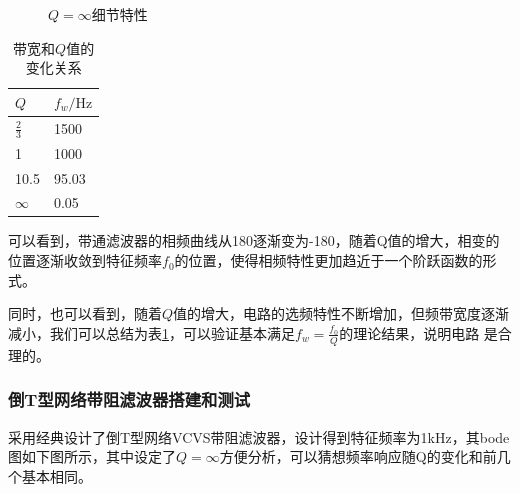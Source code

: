 \documentclass[UTF8,a4paper]{paper}
\begin{document}
\begin{multicols}{2}
\begin{figure}[H]
\caption{$Q=\infty$细节特性}
\label{PQinf1}
\end{figure}
\begin{table}[H]
\centering
\label{table1}
\caption{带宽和$Q$值的变化关系}
\begin{tabular}{ll}
\hline
$Q$&$f_w/\mathrm{Hz}$\\
\hline
$\frac{2}{3}$&1500\\
1&1000\\
10.5&95.03\\
$\infty$&0.05\\
\hline
\end{tabular}
\end{table}
\end{multicols}
可以看到，带通滤波器的相频曲线从180逐渐变为-180，随着Q值的增大，相变的位置逐渐收敛到特征频率$f_0$的位置，使得相频特性更加趋近于一个阶跃函数的形式。

同时，也可以看到，随着$Q$值的增大，电路的选频特性不断增加，但频带宽度逐渐减小，我们可以总结为表\ref{table1}，可以验证基本满足$f_w=\frac{f_0}{Q}$的理论结果，说明电路 是合理的。

\subsubsection{倒T型网络带阻滤波器搭建和测试}
采用经典设计了倒T型网络VCVS带阻滤波器，设计得到特征频率为1kHz，其bode图如下图所示，其中设定了$Q=\infty$方便分析，可以猜想频率响应随Q的变化和前几个基本相同。
\end{document}
